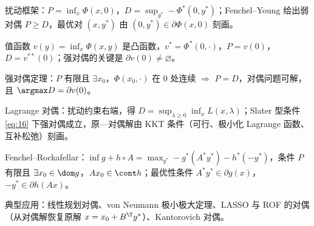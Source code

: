 \begin{keypoints}
  \item 扰动框架：$P=\inf_x\Phi(x,0)$，$D=\sup_{y^*}-\Phi^*(0,y^*)$；Fenchel--Young 给出弱对偶 $P\geqslant D$，最优对 $(x,y^*)$ 由 $(0,y^*)\in\partial\Phi(x,0)$ 刻画。
  \item 值函数 $v(y)=\inf_x\Phi(x,y)$ 是凸函数，$v^*=\Phi^*(0,\cdot)$，$P=v(0)$，$D=v^{**}(0)$；强对偶的关键是 $\partial v(0)\neq\varnothing$。
  \item 强对偶定理：$P$ 有限且 $\exists x_0$，$\Phi(x_0,\cdot)$ 在 $0$ 处连续 $\Rightarrow$ $P=D$，对偶问题可解，且 $\argmax D=\partial v(0)$。
  \item Lagrange 对偶：扰动约束右端，得 $D=\sup_{\lambda\geqslant0}\inf_xL(x,\lambda)$；Slater 型条件 \eqref{eq:16} 下强对偶成立，原—对偶解由 KKT 条件（可行、极小化 Lagrange 函数、互补松弛）刻画。
  \item Fenchel--Rockafellar：$\inf g+h\circ A=\max_{y^*}-g^*(A^*y^*)-h^*(-y^*)$，条件 $P$ 有限且 $\exists x_0\in\dom g$，$Ax_0\in\cont h$；最优性条件 $A^*y^*\in\partial g(x)$，$-y^*\in\partial h(Ax)$。
  \item 典型应用：线性规划对偶、von Neumann 极小极大定理、LASSO 与 ROF 的对偶（从对偶解恢复原解 $x=x_0+B^\T y^*$）、Kantorovich 对偶。
\end{keypoints}
